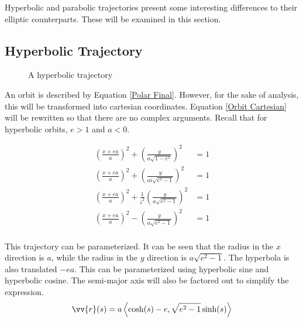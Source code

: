 \documentclass[../basicOrbitalDynamics.tex]{subfiles}
\begin{document}
Hyperbolic and parabolic trajectories present some interesting differences to their elliptic counterparts. These will be examined in this section.

\subsection{Hyperbolic Trajectory}\label{sec:Hyperbolic Orbits}

\begin{figure}[H]
    \centering
    \caption{A hyperbolic trajectory}\label{fig:Hyperbolic Trajectory}
\end{figure}

An orbit is described by Equation \eqref{Polar Final}. However, for the sake of analysis, this will be transformed into cartesian coordinates. Equation \eqref{Orbit Cartesian} will be rewritten so that there are no complex arguments. Recall that for hyperbolic orbits, $e>1$ and $a<0$.

\begin{align*}
    \left(\frac{x+ea}{a}\right)^2+\left(\frac{y}{a\sqrt{1-e^2}}\right)^2              & =1 \\
    \left(\frac{x+ea}{a}\right)^2+\left(\frac{y}{ai\sqrt{e^2-1}}\right)^2             & =1 \\
    \left(\frac{x+ea}{a}\right)^2+\frac{1}{i^2}\left(\frac{y}{a\sqrt{e^2-1}}\right)^2 & =1 \\
    \left(\frac{x+ea}{a}\right)^2-\left(\frac{y}{a\sqrt{e^2-1}}\right)^2              & =1 \\
\end{align*}

This trajectory can be parameterized. It can be seen that the radius in the $x$ direction is $a$, while the radius in the $y$ direction is $a\sqrt{e^2-1}$. The hyperbola is also translated $-ea$. This can be parameterized using hyperbolic sine and hyperbolic cosine. The semi-major axis will also be factored out to simplify the expression.
\begin{equation}\label{Hyperbola Parametric}
    \vv{r}(s)=a\left\langle\cosh(s)-e, \sqrt{e^2-1}\sinh(s)\right\rangle
\end{equation}
\end{document}

